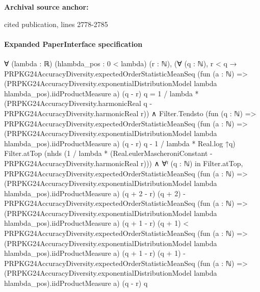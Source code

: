 \documentclass[10pt]{article}
\begin{document}
\textbf{Archival source anchor:} {\footnotesize\raggedright cited publication, lines 2778-\allowbreak{}2785\par}
\paragraph{Expanded PaperInterface specification}
\begin{ReviewVerbatim}
∀ (lambda : ℝ) (hlambda_pos : 0 < lambda) (r : ℕ),
  (∀ (q : ℕ),
      r < q →
        PRPKG24AccuracyDiversity.expectedOrderStatisticMeanSeq
            (fun (a : ℕ) =>
              (PRPKG24AccuracyDiversity.exponentialDistributionModel lambda hlambda_pos).iidProductMeasure a)
            (q - r) q =
          1 / lambda * (PRPKG24AccuracyDiversity.harmonicReal q - PRPKG24AccuracyDiversity.harmonicReal r)) ∧
    Filter.Tendsto
        (fun (q : ℕ) =>
          PRPKG24AccuracyDiversity.expectedOrderStatisticMeanSeq
              (fun (a : ℕ) =>
                (PRPKG24AccuracyDiversity.exponentialDistributionModel lambda hlambda_pos).iidProductMeasure a)
              (q - r) q -
            1 / lambda * Real.log ↑q)
        Filter.atTop (nhds (1 / lambda * (Real.eulerMascheroniConstant - PRPKG24AccuracyDiversity.harmonicReal r))) ∧
      ∀ᶠ (q : ℕ) in Filter.atTop,
        PRPKG24AccuracyDiversity.expectedOrderStatisticMeanSeq
              (fun (a : ℕ) =>
                (PRPKG24AccuracyDiversity.exponentialDistributionModel lambda hlambda_pos).iidProductMeasure a)
              (q + 2 - r) (q + 2) -
            PRPKG24AccuracyDiversity.expectedOrderStatisticMeanSeq
              (fun (a : ℕ) =>
                (PRPKG24AccuracyDiversity.exponentialDistributionModel lambda hlambda_pos).iidProductMeasure a)
              (q + 1 - r) (q + 1) <
          PRPKG24AccuracyDiversity.expectedOrderStatisticMeanSeq
              (fun (a : ℕ) =>
                (PRPKG24AccuracyDiversity.exponentialDistributionModel lambda hlambda_pos).iidProductMeasure a)
              (q + 1 - r) (q + 1) -
            PRPKG24AccuracyDiversity.expectedOrderStatisticMeanSeq
              (fun (a : ℕ) =>
                (PRPKG24AccuracyDiversity.exponentialDistributionModel lambda hlambda_pos).iidProductMeasure a)
              (q - r) q
\end{ReviewVerbatim}
\end{document}
